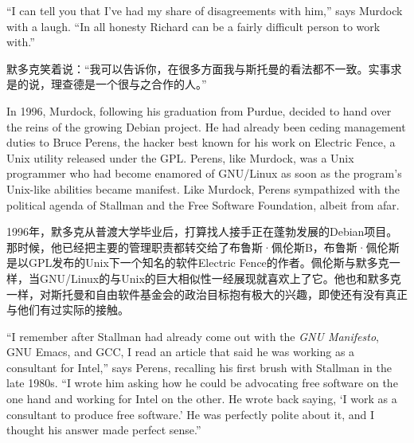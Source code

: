 \ifdefined\eng
``I can tell you that I've had my share of disagreements with him,'' says Murdock with a laugh. ``In all honesty Richard can be a fairly difficult person to work with.'' %
\fi

\ifdefined\chs
默多克笑着说：``我可以告诉你，在很多方面我与斯托曼的看法都不一致。实事求是的说，理查德是一个很与之合作的人。''
\fi

\ifdefined\eng
In 1996, Murdock, following his graduation from Purdue, decided to hand over the reins of the growing Debian project. He had already been ceding management duties to Bruce Perens, the hacker best known for his work on Electric Fence, a Unix utility released under the GPL. Perens, like Murdock, was a Unix programmer who had become enamored of GNU/Linux as soon as the program's Unix-like abilities became manifest. Like Murdock, Perens sympathized with the political agenda of Stallman and the Free Software Foundation, albeit from afar.
\fi

\ifdefined\chs
1996年，默多克从普渡大学毕业后，打算找人接手正在蓬勃发展的Debian项目。那时候，他已经把主要的管理职责都转交给了布鲁斯·佩伦斯B，布鲁斯·佩伦斯是以GPL发布的Unix下一个知名的软件Electric Fence的作者。佩伦斯与默多克一样，当GNU/Linux的与Unix的巨大相似性一经展现就喜欢上了它。他也和默多克一样，对斯托曼和自由软件基金会的政治目标抱有极大的兴趣，即使还有没有真正与他们有过实际的接触。
\fi

\ifdefined\eng
``I remember after Stallman had already come out with the \textit{GNU Manifesto}, GNU Emacs, and GCC, I read an article that said he was working as a consultant for Intel,'' says Perens, recalling his first brush with Stallman in the late 1980s. ``I wrote him asking how he could be advocating free software on the one hand and working for Intel on the other. He wrote back saying, `I work as a consultant to produce free software.' He was perfectly polite about it, and I thought his answer made perfect sense.''
\fi

